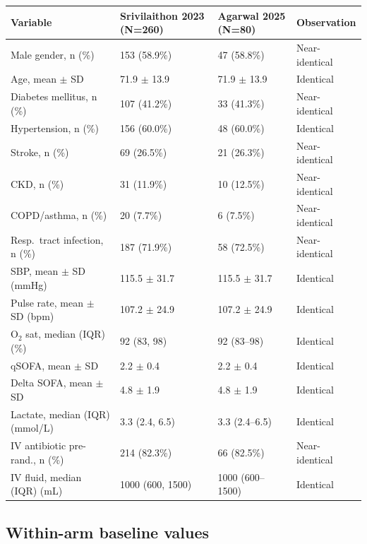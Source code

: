 \documentclass[11pt]{article}
\begin{document}
\begin{table}[H]
\centering\footnotesize
\begin{tabularx}{\textwidth}{L{3.5cm} C{3cm} C{3cm} L{2.5cm}}
\toprule
\textbf{Variable} & \textbf{Srivilaithon 2023 (N=260)} & \textbf{Agarwal 2025 (N=80)} & \textbf{Observation} \\
\midrule
Male gender, n (\%) & 153 (58.9\%) & 47 (58.8\%) & Near-identical \\
Age, mean $\pm$ SD & 71.9 $\pm$ 13.9 & 71.9 $\pm$ 13.9 & Identical \\
Diabetes mellitus, n (\%) & 107 (41.2\%) & 33 (41.3\%) & Near-identical \\
Hypertension, n (\%) & 156 (60.0\%) & 48 (60.0\%) & Identical \\
Stroke, n (\%) & 69 (26.5\%) & 21 (26.3\%) & Near-identical \\
CKD, n (\%) & 31 (11.9\%) & 10 (12.5\%) & Near-identical \\
COPD/asthma, n (\%) & 20 (7.7\%) & 6 (7.5\%) & Near-identical \\
Resp.\ tract infection, n (\%) & 187 (71.9\%) & 58 (72.5\%) & Near-identical \\
SBP, mean $\pm$ SD (mmHg) & 115.5 $\pm$ 31.7 & 115.5 $\pm$ 31.7 & Identical \\
Pulse rate, mean $\pm$ SD (bpm) & 107.2 $\pm$ 24.9 & 107.2 $\pm$ 24.9 & Identical \\
O$_2$ sat, median (IQR) (\%) & 92 (83, 98) & 92 (83--98) & Identical \\
qSOFA, mean $\pm$ SD & 2.2 $\pm$ 0.4 & 2.2 $\pm$ 0.4 & Identical \\
Delta SOFA, mean $\pm$ SD & 4.8 $\pm$ 1.9 & 4.8 $\pm$ 1.9 & Identical \\
Lactate, median (IQR) (mmol/L) & 3.3 (2.4, 6.5) & 3.3 (2.4--6.5) & Identical \\
IV antibiotic pre-rand., n (\%) & 214 (82.3\%) & 66 (82.5\%) & Near-identical \\
IV fluid, median (IQR) (mL) & 1000 (600, 1500) & 1000 (600--1500) & Identical \\
\bottomrule
\end{tabularx}
\end{table}

\subsection{Within-arm baseline values}
\end{document}
